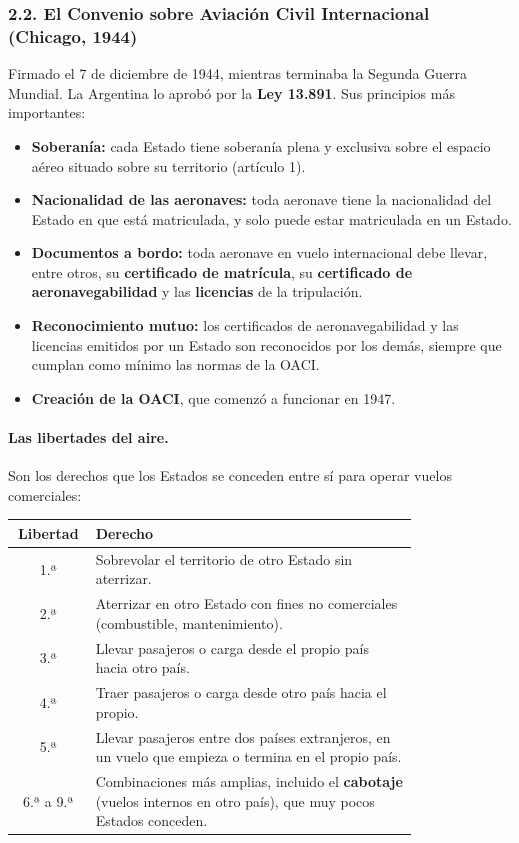 \subsubsection*{2.2. El Convenio sobre Aviación Civil Internacional (Chicago, 1944)}
Firmado el 7 de diciembre de 1944, mientras terminaba la Segunda Guerra Mundial. La Argentina lo
aprobó por la \textbf{Ley 13.891}. Sus principios más importantes:
\begin{itemize}
  \item \textbf{Soberanía:} cada Estado tiene soberanía plena y exclusiva sobre el espacio aéreo
        situado sobre su territorio (artículo 1).
  \item \textbf{Nacionalidad de las aeronaves:} toda aeronave tiene la nacionalidad del Estado
        en que está matriculada, y solo puede estar matriculada en un Estado.
  \item \textbf{Documentos a bordo:} toda aeronave en vuelo internacional debe llevar, entre
        otros, su \textbf{certificado de matrícula}, su \textbf{certificado de
        aeronavegabilidad} y las \textbf{licencias} de la tripulación.
  \item \textbf{Reconocimiento mutuo:} los certificados de aeronavegabilidad y las licencias
        emitidos por un Estado son reconocidos por los demás, siempre que cumplan como mínimo
        las normas de la OACI.
  \item \textbf{Creación de la OACI}, que comenzó a funcionar en 1947.
\end{itemize}

\paragraph*{Las libertades del aire.}
Son los derechos que los Estados se conceden entre sí para operar vuelos comerciales:
\begin{center}
\small
\begin{tabular}{|c|p{0.80\linewidth}|}
\hline
\textbf{Libertad} & \textbf{Derecho} \\ \hline
1.ª & Sobrevolar el territorio de otro Estado sin aterrizar. \\ \hline
2.ª & Aterrizar en otro Estado con fines no comerciales (combustible, mantenimiento). \\ \hline
3.ª & Llevar pasajeros o carga desde el propio país hacia otro país. \\ \hline
4.ª & Traer pasajeros o carga desde otro país hacia el propio. \\ \hline
5.ª & Llevar pasajeros entre dos países extranjeros, en un vuelo que empieza o termina en el
propio país. \\ \hline
6.ª a 9.ª & Combinaciones más amplias, incluido el \textbf{cabotaje} (vuelos internos en otro
país), que muy pocos Estados conceden. \\ \hline
\end{tabular}
\end{center}


